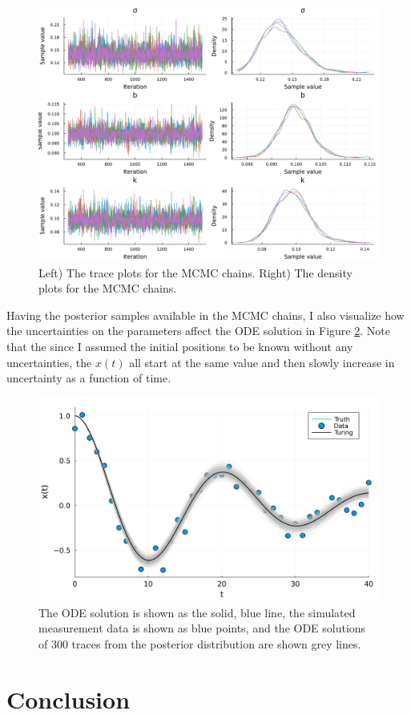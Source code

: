 \documentclass[10pt,a4paper]{article}
\begin{document}
\begin{figure}[H]
    \includegraphics[width=\linewidth]{turing_chains.pdf}
    \caption{Left) The trace plots for the MCMC chains. Right) The density plots for the MCMC chains.}
    \label{fig:MCMC_chains}
\end{figure}

Having the posterior samples available in the MCMC chains, I also visualize how the
uncertainties on the parameters affect the ODE solution in Figure \ref{fig:MCMC}.
Note that the since I assumed the initial positions to be known without any
uncertainties, the $x(t)$ all start at the same value and then slowly increase in uncertainty
as a function of time.

\begin{figure}[H]
    \includegraphics[width=\linewidth]{turing.pdf}
    \caption{The ODE solution is shown as the solid, blue line,
        the simulated measurement data is shown as blue points,
        and the ODE solutions of 300 traces from the posterior distribution are shown grey lines.}
    \label{fig:MCMC}
\end{figure}


\section*{Conclusion}
\end{document}
